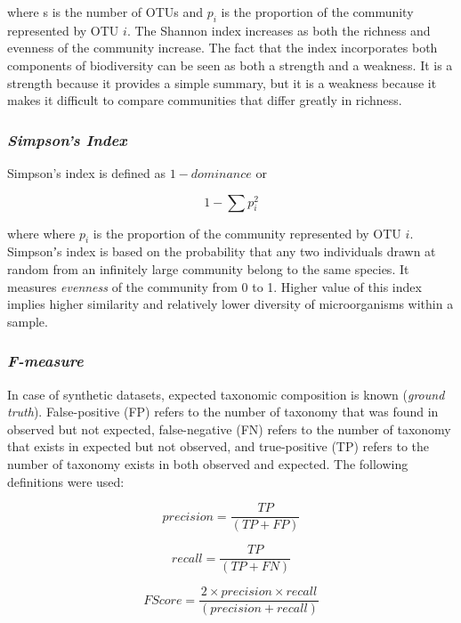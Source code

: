 \documentclass[10pt, conference, compsocconf]{IEEEtran}
\begin{document}
where s is the number of OTUs and $p_i$ is the proportion of the community represented by OTU $i$. The Shannon index increases as both the richness and evenness of the community increase. The fact that the index incorporates both components of biodiversity can be seen as both a strength and a weakness. It is a strength because it provides a simple summary, but it is a weakness because it makes it difficult to compare communities that differ greatly in richness.


\subsubsection{\textit{Simpson's Index}}
Simpson’s index is defined as ${1-dominance}$ or

\begin{equation}
1 - \sum p_i^2
\end{equation}

where where $p_i$ is the proportion of the community represented by OTU $i$. Simpsonʼs index is based on the probability that any two individuals drawn at random from an infinitely large community belong to the same species. It measures \textit{evenness} of the community from 0 to 1. Higher value of this index implies higher similarity and relatively lower diversity of microorganisms within a sample.


\subsubsection{\textit{F-measure}}
In case of synthetic datasets, expected taxonomic composition is known (\emph{ground truth}). False-positive (FP) refers to the number of taxonomy that was found in observed but not expected, false-negative (FN) refers to the number of taxonomy that exists in expected but not observed, and true-positive (TP) refers to the number of taxonomy exists in both observed and expected. The following definitions were used:

\begin{equation}
precision = \frac{TP}{(TP + FP)}
\end{equation}

\begin{equation}
recall = \frac{TP}{(TP + FN)}
\end{equation}

\begin{equation}
F Score = \frac{2 \times precision \times recall}{(precision + recall)}
\end{equation}
\end{document}
